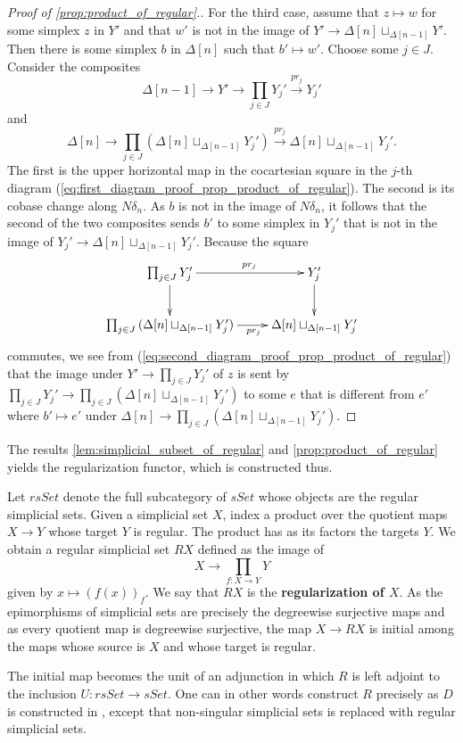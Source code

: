 \begin{proof}[Proof of \cref{prop:product_of_regular}.]
For the third case, assume that $z\mapsto w$ for some simplex $z$ in $Y'$ and that $w'$ is not in the image of $Y'\to \Delta [n]\sqcup _{\Delta [n-1]}Y'$. Then there is some simplex $b$ in $\Delta [n]$ such that $b'\mapsto w'$. Choose some $j\in J$. Consider the composites
\[\Delta [n-1]\to Y'\to \prod _{j\in J}{Y_j'}\xrightarrow{pr_j} Y_j'\]
and
\[\Delta [n]\to \prod _{j\in J}{(\Delta [n]\sqcup _{\Delta [n-1]}Y_j')}\xrightarrow{pr_j} \Delta [n]\sqcup _{\Delta [n-1]}Y_j'.\]
The first is the upper horizontal map in the cocartesian square in the $j$-th diagram (\ref{eq:first_diagram_proof_prop_product_of_regular}). The second is its cobase change along $N\delta _n$. As $b$ is not in the image of $N\delta _n$, it follows that the second of the two composites sends $b'$ to some simplex in $Y_j'$ that is not in the image of $Y_j'\to \Delta [n]\sqcup _{\Delta [n-1]}Y_j'$. Because the square
\begin{displaymath}
\xymatrix{
\prod _{j\in J}{Y_j'} \ar[d] \ar[r]^(.55){pr_j} & Y_j' \ar[d] \\
\prod _{j\in J}{(\Delta [n]\sqcup _{\Delta [n-1]}Y_j')} \ar[r]_(.58){pr_j} & \Delta [n]\sqcup _{\Delta [n-1]}Y_j'
}
\end{displaymath}
commutes, we see from (\ref{eq:second_diagram_proof_prop_product_of_regular}) that the image under $Y'\to \prod _{j\in J}{Y_j'}$ of $z$ is sent by $\prod _{j\in J}{Y_j'}\to \prod _{j\in J}{(\Delta [n]\sqcup _{\Delta [n-1]}Y_j')}$ to some $e$ that is different from $e'$ where $b'\mapsto e'$ under $\Delta [n]\to \prod _{j\in J}{(\Delta [n]\sqcup _{\Delta [n-1]}Y_j')}$.
\end{proof}
\noindent The results \cref{lem:simplicial_subset_of_regular} and \cref{prop:product_of_regular} yields the regularization functor, which is constructed thus.

Let $rsSet$ denote the full subcategory of $sSet$ whose objects are the regular simplicial sets. Given a simplicial set $X$, index a product over the quotient maps $X\to Y$ whose target $Y$ is regular. The product has as its factors the targets $Y$. We obtain a regular simplicial set $RX$ defined as the image of
\[X\to \prod _{f:X\to Y}{Y}\]
given by $x\mapsto (f(x))_f$. We say that $RX$ is the \textbf{regularization of $X$}. As the epimorphisms of simplicial sets are precisely the degreewise surjective maps and as every quotient map is degreewise surjective, the map $X\to RX$ is initial among the maps whose source is $X$ and whose target is regular.

The initial map becomes the unit of an adjunction in which $R$ is left adjoint to the inclusion $U:rsSet\to sSet$. One can in other words construct $R$ precisely as $D$ is constructed in \cite[Rem.~2.2.12]{WJR13}, except that non-singular simplicial sets is replaced with regular simplicial sets.

